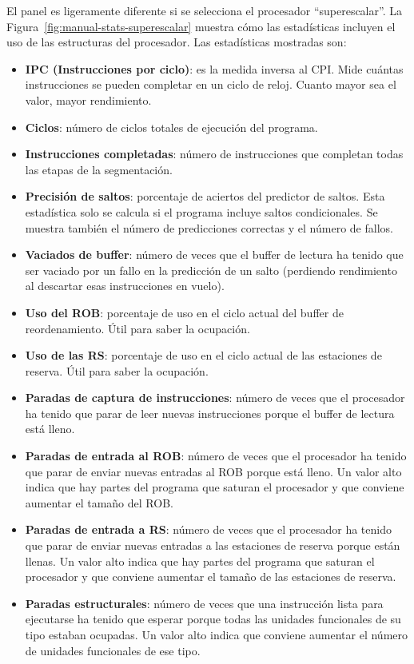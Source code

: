 \documentclass[../main.tex]{subfiles}
\begin{document}
El panel es ligeramente diferente si se selecciona el procesador ``superescalar''. La Figura~\ref{fig:manual-stats-superescalar} muestra cómo las estadísticas incluyen el uso de las estructuras del procesador. Las estadísticas mostradas son:

\begin{itemize}
	\item \textbf{IPC (Instrucciones por ciclo)}: es la medida inversa al CPI. Mide cuántas instrucciones se pueden completar en un ciclo de reloj. Cuanto mayor sea el valor, mayor rendimiento.
	\item \textbf{Ciclos}: número de ciclos totales de ejecución del programa.
	\item \textbf{Instrucciones completadas}: número de instrucciones que completan todas las etapas de la segmentación.
	\item \textbf{Precisión de saltos}: porcentaje de aciertos del predictor de saltos. Esta estadística solo se calcula si el programa incluye saltos condicionales. Se muestra también el número de predicciones correctas y el número de fallos.
	\item \textbf{Vaciados de buffer}: número de veces que el buffer de lectura ha tenido que ser vaciado por un fallo en la predicción de un salto (perdiendo rendimiento al descartar esas instrucciones en vuelo).
	\item \textbf{Uso del ROB}: porcentaje de uso en el ciclo actual del buffer de reordenamiento. Útil para saber la ocupación.
	\item \textbf{Uso de las RS}: porcentaje de uso en el ciclo actual de las estaciones de reserva. Útil para saber la ocupación.
	\item \textbf{Paradas de captura de instrucciones}: número de veces que el procesador ha tenido que parar de leer nuevas instrucciones porque el buffer de lectura está lleno.
	\item \textbf{Paradas de entrada al ROB}: número de veces que el procesador ha tenido que parar de enviar nuevas entradas al ROB porque está lleno. Un valor alto indica que hay partes del programa que saturan el procesador y que conviene aumentar el tamaño del ROB.
	\item \textbf{Paradas de entrada a RS}: número de veces que el procesador ha tenido que parar de enviar nuevas entradas a las estaciones de reserva porque están llenas. Un valor alto indica que hay partes del programa que saturan el procesador y que conviene aumentar el tamaño de las estaciones de reserva.
	\item \textbf{Paradas estructurales}: número de veces que una instrucción lista para ejecutarse ha tenido que esperar porque todas las unidades funcionales de su tipo estaban ocupadas. Un valor alto indica que conviene aumentar el número de unidades funcionales de ese tipo.
\end{itemize}
\end{document}
